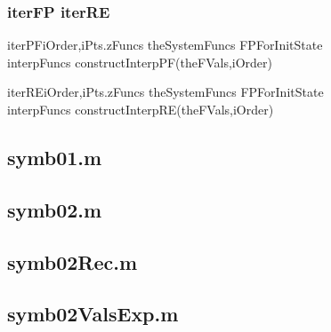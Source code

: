 \documentclass{beamer}
\begin{document}
\begin{frame}
\frametitle{iterFP iterRE}
\label{sec:code}


\begin{pseudocode}{iterPF}{iOrder,iPts.zFuncs}
theSystemFuncs \GETS FPForInitState\\
interpFuncs \GETS constructInterpPF(theFVals,iOrder)\\
\end{pseudocode}
\begin{pseudocode}{iterRE}{iOrder,iPts.zFuncs}
theSystemFuncs \GETS FPForInitState\\
interpFuncs \GETS constructInterpRE(theFVals,iOrder)\\
\end{pseudocode}
\end{frame}
\subsection{symb01.m}

\begin{frame}
\label{sec:symb01.m}
\end{frame}



\newpage
\subsection{symb02.m}

\begin{frame}
\label{sec:symb02.m}  
\end{frame}


\newpage
\subsection{symb02Rec.m}
\begin{frame}
\label{sec:symb02Rec.m}  
\end{frame}



\newpage
\subsection{symb02ValsExp.m}
\begin{frame}
\label{sec:symb02ValsExp.m}
\end{frame}
\end{document}
